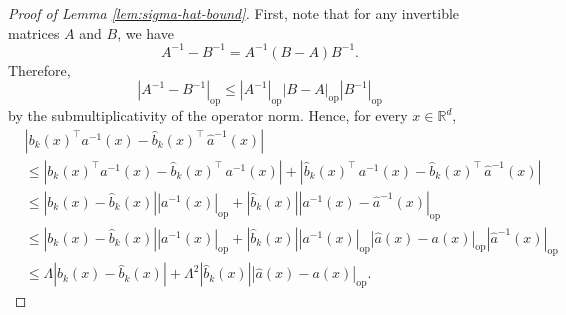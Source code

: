 \documentclass{article}
\theoremstyle{plain}
\theoremstyle{definition}
\theoremstyle{remark}
\newcommand{\RD}{\mathbb{R}^{d}}
\begin{document}
\begin{proof}[Proof of Lemma \ref{lem:sigma-hat-bound}]
First, note that for any invertible matrices \(A\) and \(B\), we have
\[
A^{-1}-B^{-1}=A^{-1}(B-A)B^{-1}.
\]
Therefore,
\begin{equation}%
   |A^{-1}-B^{-1}|_{\mathrm{op}}\leq|A^{-1}|_{\mathrm{op}}|B-A|_{\mathrm{op}}|B^{-1}|_{\mathrm{op}}\nonumber
\end{equation}
by the submultiplicativity of the operator norm.
Hence, for every \(x\in\RD\),
\begin{align}
&\left| b_k(x)^{\top}a^{-1}(x)-\widehat b_k(x)^{\top}\,\widehat{a}^{-1}(x)\right|\nonumber\\
&\leq \left| b_k(x)^{\top}a^{-1}(x)- \widehat{b}_k(x)^{\top}\,a^{-1}(x)\right|+\left| \widehat{b}_k(x)^{\top}\,a^{-1}(x)-\widehat b_k(x)^{\top}\,\widehat{a}^{-1}(x)\right|\nonumber\\
&\leq |b_k(x)-\widehat b_k(x)||a^{-1}(x)|_{\mathrm{op}}+|\widehat{b}_k(x)||a^{-1}(x)-\widehat{a}^{-1}(x)|_{\mathrm{op}}\nonumber\\
&\leq |b_k(x)-\widehat b_k(x)||{a}^{-1}(x)|_{\mathrm{op}}+ |\widehat{b}_k(x)||a^{-1}(x)|_{\mathrm{op}}|\widehat{a}(x)-a(x)|_{\mathrm{op}}|\widehat{a}^{-1}(x)|_{\mathrm{op}}\nonumber\\
&\leq \Lambda|b_k(x)-\widehat b_k(x)|+\Lambda^2|\widehat{b}_k(x)||\widehat{a}(x)-a(x)|_{\mathrm{op}}.\nonumber
\end{align}


\end{proof}
\end{document}
